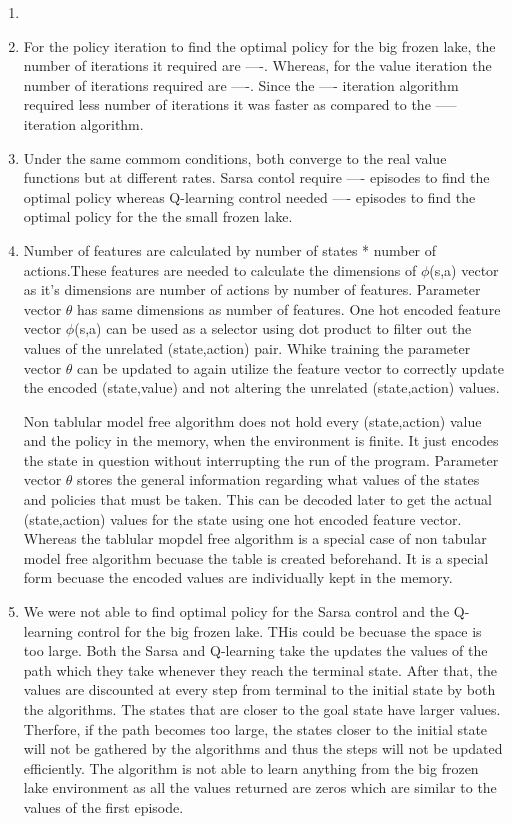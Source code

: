 \documentclass[11pt]{article}
\begin{document}
	\begin{enumerate}
		\item 
		
		\item For the policy iteration to find the optimal policy for the big frozen lake, the number of iterations it required are ----. Whereas, for the value iteration the number of iterations required are ----. Since the ---- iteration algorithm required less number of iterations it was faster as compared to the  ----- iteration algorithm.
		
		\item Under the same commom conditions, both converge to the real value functions but at different rates. Sarsa contol require ---- episodes to find the optimal policy whereas Q-learning control needed ---- episodes to find the optimal policy for the the small frozen lake. 
		
		\item Number of features are calculated by number of states * number of actions.These features are needed to calculate the dimensions of $\phi$(s,a) vector as it's dimensions are number of actions by number of features. Parameter vector $\theta$ has same dimensions as number of features. One hot encoded feature vector $\phi$(s,a) can be used as a selector using dot product to filter out the values of the unrelated (state,action) pair. Whike training the parameter vector $\theta$ can be updated to again utilize the feature vector to correctly update the encoded (state,value) and not altering the unrelated (state,action) values. \par
		
		Non tablular model free algorithm does not hold every (state,action) value and the policy in the memory, when the environment is finite. It just encodes the state in question without interrupting the run of the program. Parameter vector $\theta$ stores the general information regarding what values of the states and policies that must be taken. This can be decoded later to get the actual (state,action) values for the state using one hot encoded feature vector. Whereas the tablular mopdel free algorithm is a special case of non tabular model free algorithm becuase the table is created beforehand. It is a special form becuase the encoded values are individually kept in the memory.
		
		\item We were not able to find optimal policy for the Sarsa control and the Q-learning control for the big frozen lake. THis could be becuase the space is too large. Both the Sarsa and Q-learning take the updates the values of the path which they take whenever they reach the terminal state. After that, the values are discounted at every step from terminal to the initial state by both the algorithms. The states that are closer to the goal state have larger values. Therfore, if the path becomes too large, the states closer to the initial state will not be gathered by the algorithms and thus the steps will not be updated efficiently. The algorithm is not able to learn anything from the big frozen lake environment as all the values returned are zeros which are similar to the values of the first episode. \par
		

\end{enumerate}
\end{document}
